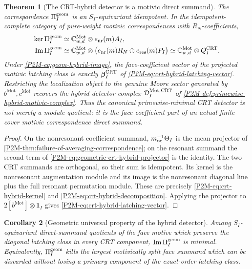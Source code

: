 \documentclass[11pt]{article}
\newtheorem{theorem}{Theorem}[section]
\newtheorem{corollary}[theorem]{Corollary}
\theoremstyle{remark}
\newcommand{\Mot}{\mathrm{Mot}}
\begin{document}
\begin{theorem}[The CRT-hybrid detector is a motivic direct summand]
\label{P2M-thm:crt-hybrid-motivic-projector}
The correspondence \(\Pi_I^{\rm geom}\) is an \(S_I\)-equivariant
idempotent.  In the idempotent-complete category of pure-weight motivic
correspondences with \(R_N\)-coefficients,
\begin{align}
 \ker\Pi_I^{\rm geom}
 &\simeq
 \mathbb C^{\Mot}_{w,d}\otimes e_{\rm nr}(m)A_I,
 \label{P2M-eq:geom-hybrid-kernel}\\
 \operatorname{Im}\Pi_I^{\rm geom}
 &\simeq
 \mathbb C^{\Mot}_{w,d}\otimes
 \bigl(e_{\rm nr}(m)R_N\oplus e_{\rm res}(m)P_I\bigr)
 \simeq
 \mathbb C^{\Mot}_{w,d}\otimes Q_I^{\rm CRT}.
 \label{P2M-eq:geom-hybrid-image}
\end{align}
Under \eqref{P2M-eq:geom-hybrid-image}, the face-coefficient vector of the
projected motivic latching class is exactly
\(\boldsymbol\beta_I^{\rm CRT}\) of
\eqref{P2M-eq:crt-hybrid-latching-vector}.  Restricting the localization object to
the genuine Moore sector generated by \(b^{\Mot},c^{\Mot}\) recovers the
hybrid detector complex \(\mathcal D_I^{\Mot,\rm CRT}\) of
\cref{P2M-def:primewise-hybrid-motivic-complex}.  Thus the canonical
primewise-minimal CRT detector is not merely a module quotient: it is the
face-coefficient part of an actual finite-cover motivic correspondence direct
summand.
\end{theorem}

\begin{proof}
On the nonresonant coefficient summand,
\(m_{\rm nr}^{-1}\Theta_I\) is the mean projector of
\cref{P2M-thm:failure-of-averaging-correspondence}; on the resonant summand the
second term of \eqref{P2M-eq:geometric-crt-hybrid-projector} is the identity.
The two CRT summands are orthogonal, so their sum is idempotent.  Its kernel is
the nonresonant augmentation module and its image is the nonresonant diagonal
line plus the full resonant permutation module.  These are precisely
\eqref{P2M-eq:crt-hybrid-kernel} and \eqref{P2M-eq:crt-hybrid-decomposition}.
Applying the projector to
\(2[b^{\Mot}]\otimes\mathbf1_I\) gives
\eqref{P2M-eq:crt-hybrid-latching-vector}.
\end{proof}

\begin{corollary}[Geometric universal property of the hybrid detector]
\label{P2M-cor:geometric-hybrid-universal-property}
Among \(S_I\)-equivariant direct-summand quotients of the face motive which
preserve the diagonal latching class in every CRT component,
\(\operatorname{Im}\Pi_I^{\rm geom}\) is minimal.  Equivalently,
\(\Pi_I^{\rm geom}\) kills the largest motivically split face summand which
can be discarded without losing a primary component of the exact-order
latching class.
\end{corollary}
\end{document}
